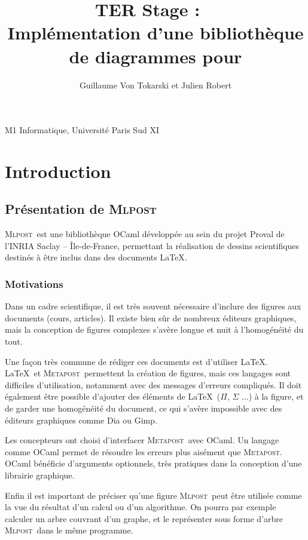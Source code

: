 \documentclass[a4paper,12pt]{article}
\title{\huge{TER Stage : ~\\
  Implémentation d'une bibliothèque de diagrammes pour \mlpost}}
\author{ Guillaume Von Tokarski et Julien Robert}
\newcommand{\mlpost}{\textsc{Mlpost}}
\newcommand{\meta}{\textsc{Metapost}}
\begin{document}
\maketitle

\begin{center}M1 Informatique, Université Paris Sud XI\end{center}
\newpage
\tableofcontents
\newpage
\section{Introduction}

\subsection{Présentation de \mlpost}
\mlpost\ est une bibliothèque OCaml développée au sein du projet Proval de l’INRIA Saclay – Île-de-France, permettant la réalisation de dessins scientifiques destinés à être inclus dans des documents \LaTeX \cite{mlpost}.

\subsubsection{Motivations}
Dans un cadre scientifique, il est très souvent nécessaire d'inclure des figures aux documents (cours, articles). Il existe bien sûr de nombreux éditeurs graphiques, mais la conception de figures complexes s'avère longue et nuit à l'homogénéité du tout. 
\bigskip 


Une façon très commune de rédiger ces documents est d'utiliser \LaTeX. \LaTeX\ et \meta\ permettent la création de figures, mais ces langages sont difficiles d'utilisation, notamment avec des messages d'erreurs compliqués. Il doit également être possible d'ajouter des éléments de \LaTeX\ ($\Pi$, $\Sigma$ ...) à la figure, et de garder une homogénéité du document, ce qui s'avère impossible avec des éditeurs graphiques comme Dia ou Gimp. 
\bigskip

Les concepteurs ont choisi d'interfacer \meta\ avec OCaml. Un langage comme OCaml permet de résoudre les erreurs plus aisément que \meta. OCaml bénéficie d'arguments optionnels, très pratiques dans la conception d'une librairie graphique. 

Enfin il est important de préciser qu'une figure \mlpost\ peut être utilisée comme la vue du résultat d'un calcul ou d'un algorithme. On pourra par exemple calculer un arbre couvrant d'un graphe, et le représenter sous forme d'arbre \mlpost\ dans le même programme.
\end{document}
